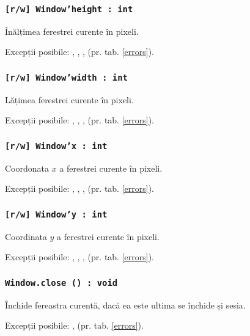\subsubsection{\texttt{[r/w] Window'height : int}}

Înălțimea ferestrei curente în pixeli.

Excepții posibile: , , ,  (pr. tab. \ref{errors}).

\subsubsection{\texttt{[r/w] Window'width : int}}

Lățimea ferestrei curente în pixeli.

Excepții posibile: , , ,  (pr. tab. \ref{errors}).

\subsubsection{\texttt{[r/w] Window'x : int}}

Coordonata $x$ a ferestrei curente în pixeli.

Excepții posibile: , , ,  (pr. tab. \ref{errors}).

\subsubsection{\texttt{[r/w] Window'y : int}}

Coordinata $y$ a ferestrei curente în pixeli.

Excepții posibile: , , ,  (pr. tab. \ref{errors}).

\subsubsection{\texttt{Window.close () : void}}

Închide fereastra curentă, dacă ea este ultima se închide și sesia.

Excepții posibile: ,  (pr. tab. \ref{errors}).

